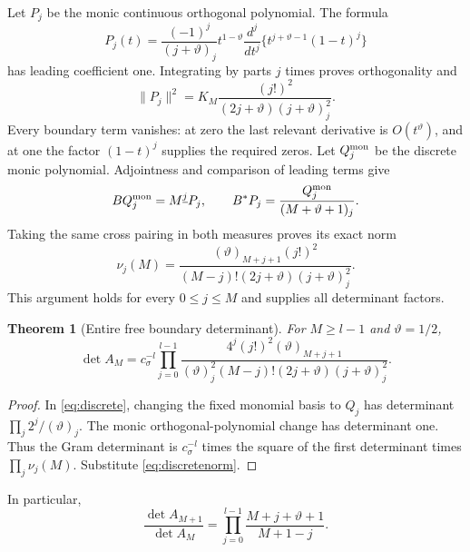 \documentclass[11pt,a4paper]{article}
\newtheorem{theorem}{Theorem}[section]
\begin{document}
Let $P_j$ be the monic continuous orthogonal polynomial. The formula
\begin{equation}
 P_j(t)=\frac{(-1)^j}{(j+\vartheta)_j}
 t^{1-\vartheta}\frac{d^j}{dt^j}
 \{t^{j+\vartheta-1}(1-t)^j\}
\end{equation}
has leading coefficient one. Integrating by parts $j$ times proves orthogonality and
\begin{equation}
 \|P_j\|^2=K_M\frac{(j!)^2}{(2j+\vartheta)(j+\vartheta)_j^2}.
\end{equation}
Every boundary term vanishes: at zero the last relevant derivative is $O(t^{\vartheta})$, and at one the factor $(1-t)^j$ supplies the required zeros.
Let $Q_j^{\rm mon}$ be the discrete monic polynomial. Adjointness and comparison of leading terms give
\begin{equation}
 BQ_j^{\rm mon}=M^{\underline j}P_j,\qquad
 B^*P_j=\frac{Q_j^{\rm mon}}{(M+\vartheta+1)_j}.
\end{equation}
Taking the same cross pairing in both measures proves its exact norm
\begin{equation}
 \nu_j(M)=
 \frac{(\vartheta)_{M+j+1}(j!)^2}
 {(M-j)!(2j+\vartheta)(j+\vartheta)_j^2}.
 \label{eq:discretenorm}
\end{equation}
This argument holds for every $0\le j\le M$ and supplies all determinant factors.

\begin{theorem}[Entire free boundary determinant]
For $M\ge l-1$ and $\vartheta=1/2$,
\begin{equation}
 \boxed{
 \det A_M=c_\sigma^{-l}\prod_{j=0}^{l-1}
 \frac{4^j(j!)^2(\vartheta)_{M+j+1}}
 {(\vartheta)_j^2(M-j)!(2j+\vartheta)(j+\vartheta)_j^2}.}
 \label{eq:detfree}
\end{equation}
\end{theorem}
\begin{proof}
In \eqref{eq:discrete}, changing the fixed monomial basis to $Q_j$ has determinant $\prod_j2^j/(\vartheta)_j$. The monic orthogonal-polynomial change has determinant one. Thus the Gram determinant is $c_\sigma^{-l}$ times the square of the first determinant times $\prod_j\nu_j(M)$. Substitute \eqref{eq:discretenorm}.
\end{proof}
In particular,
\begin{equation}
 \frac{\det A_{M+1}}{\det A_M}
 =\prod_{j=0}^{l-1}\frac{M+j+\vartheta+1}{M+1-j}.
 \label{eq:freeincrement}
\end{equation}
\end{document}
